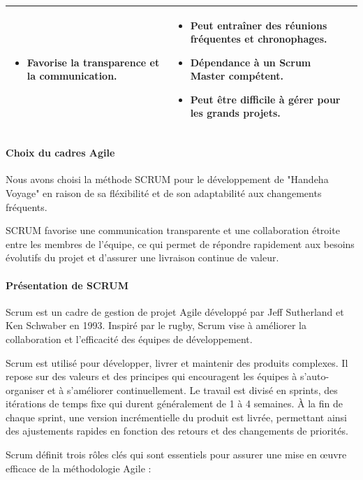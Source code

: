 \documentclass[12pt]{report}
\makeatletter
\renewcommand\subparagraph{\@startsection{subparagraph}{5}{\z@}{3.25ex \@plus1ex \@minus.2ex}{1ex \@plus.2ex}{\normalfont\normalsize\bfseries}} \renewcommand\thesubparagraph{$-$} \makeatother
\makeatother
\begin{document}
\begin{longtable}{|p{3cm}|p{5.5cm}|p{5.5cm}|}
\begin{itemize}
							\item Favorise la transparence et la communication.
						\end{itemize} &
						\begin{itemize}
							\item Peut entraîner des réunions fréquentes et chronophages.
							\item Dépendance à un Scrum Master compétent.
							\item Peut être difficile à gérer pour les grands projets.
						\end{itemize} \\
						\hline
				    \end{longtable}
				
				\paragraph{Choix du cadres Agile}
	
				Nous avons choisi la méthode SCRUM pour le développement de "Handeha Voyage" en raison de sa fléxibilité et de son adaptabilité aux changements fréquents.

				SCRUM favorise une communication transparente et une collaboration étroite entre les membres de l'équipe, ce qui permet de répondre rapidement aux besoins évolutifs du projet et d'assurer une livraison continue de valeur.

				\paragraph{Présentation de SCRUM}

				Scrum est un cadre de gestion de projet Agile développé par Jeff Sutherland et Ken Schwaber en 1993. Inspiré par le rugby, Scrum vise à améliorer la collaboration et l'efficacité des équipes de développement.
				
				Scrum est utilisé pour développer, livrer et maintenir des produits complexes. Il repose sur des valeurs et des principes qui encouragent les équipes à s'auto-organiser et à s'améliorer continuellement. Le travail est divisé en sprints, des itérations de temps fixe qui durent généralement de 1 à 4 semaines. À la fin de chaque sprint, une version incrémentielle du produit est livrée, permettant ainsi des ajustements rapides en fonction des retours et des changements de priorités\cite{ScrumGuide}.

				\subparagraph{Rôles dans Scrum}

				Scrum définit trois rôles clés qui sont essentiels pour assurer une mise en œuvre efficace de la méthodologie Agile :
\end{document}
